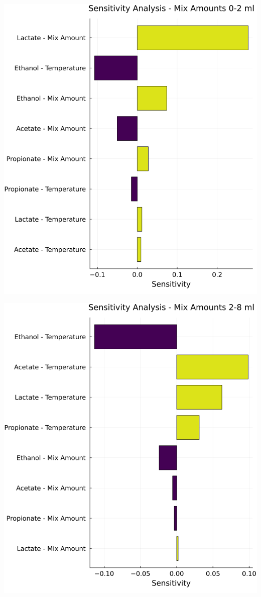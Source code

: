 \documentclass[11pt]{article}
\begin{document}
\begin{center}
\includegraphics[width=.9\linewidth]{../plots/sensitivity/tornado_low.png}
\end{center}

\begin{center}
\includegraphics[width=.9\linewidth]{../plots/sensitivity/tornado_high.png}
\end{center}
\end{document}
